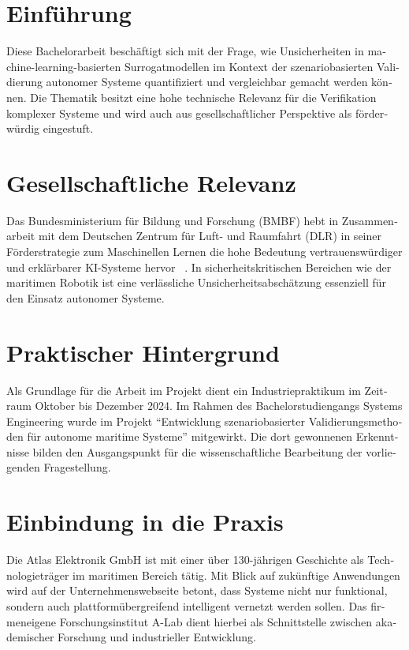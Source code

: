 \begin{otherlanguage}{ngerman}
\section{Einführung}

Diese Bachelorarbeit beschäftigt sich mit der Frage, wie Unsicherheiten in machine-learning-basierten Surrogatmodellen im Kontext der szenariobasierten Validierung autonomer Systeme quantifiziert und vergleichbar gemacht werden können. Die Thematik besitzt eine hohe technische Relevanz für die Verifikation komplexer Systeme und wird auch aus gesellschaftlicher Perspektive als förderwürdig eingestuft.

\section{Gesellschaftliche Relevanz}

Das Bundesministerium für Bildung und Forschung (BMBF) hebt in Zusammenarbeit mit dem Deutschen Zentrum für Luft- und Raumfahrt (DLR) in seiner Förderstrategie zum Maschinellen Lernen die hohe Bedeutung vertrauenswürdiger und erklärbarer KI-Systeme hervor ~\parencite{bmbf2025}. In sicherheitskritischen Bereichen wie der maritimen Robotik ist eine verlässliche Unsicherheitsabschätzung essenziell für den Einsatz autonomer Systeme.

\section{Praktischer Hintergrund}

Als Grundlage für die Arbeit im Projekt dient ein Industriepraktikum im Zeitraum Oktober bis Dezember 2024. Im Rahmen des Bachelorstudiengangs Systems Engineering wurde im Projekt \enquote{Entwicklung szenariobasierter Validierungsmethoden für autonome maritime Systeme} mitgewirkt. Die dort gewonnenen Erkenntnisse bilden den Ausgangspunkt für die wissenschaftliche Bearbeitung der vorliegenden Fragestellung.

\section{Einbindung in die Praxis}

Die Atlas Elektronik GmbH ist mit einer über 130-jährigen Geschichte als Technologieträger im maritimen Bereich tätig. Mit Blick auf zukünftige Anwendungen wird auf der Unternehmenswebseite betont, dass Systeme nicht nur funktional, sondern auch plattformübergreifend intelligent vernetzt werden sollen. Das firmeneigene Forschungsinstitut A-Lab dient hierbei als Schnittstelle zwischen akademischer Forschung und industrieller Entwicklung.


\end{otherlanguage}
